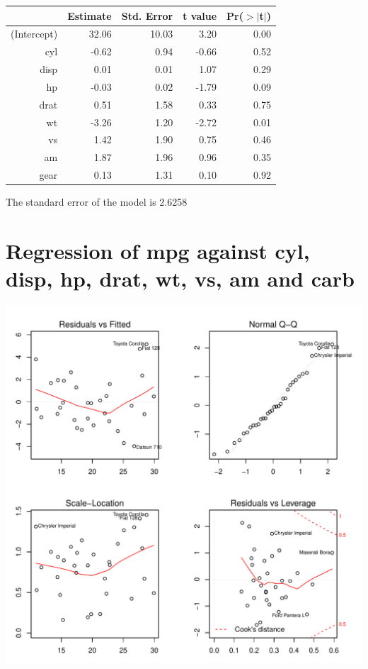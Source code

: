 \documentclass{article}\usepackage[]{graphicx}\usepackage[]{color}
\makeatletter
\def\maxwidth{ %
  \ifdim\Gin@nat@width>\linewidth
    \linewidth
  \else
    \Gin@nat@width
  \fi
}
\newenvironment{knitrout}{}{} %
\makeatother
\begin{document}
\begin{table}[ht]
\centering
\begin{tabular}{rrrrr}
  \hline
 & Estimate & Std. Error & t value & Pr($>$$|$t$|$) \\ 
  \hline
(Intercept) & 32.06 & 10.03 & 3.20 & 0.00 \\ 
  cyl & -0.62 & 0.94 & -0.66 & 0.52 \\ 
  disp & 0.01 & 0.01 & 1.07 & 0.29 \\ 
  hp & -0.03 & 0.02 & -1.79 & 0.09 \\ 
  drat & 0.51 & 1.58 & 0.33 & 0.75 \\ 
  wt & -3.26 & 1.20 & -2.72 & 0.01 \\ 
  vs & 1.42 & 1.90 & 0.75 & 0.46 \\ 
  am & 1.87 & 1.96 & 0.96 & 0.35 \\ 
  gear & 0.13 & 1.31 & 0.10 & 0.92 \\ 
   \hline
\end{tabular}
\end{table}




The standard error of the model is 2.6258

\newpage

\section{Regression of mpg against cyl, disp, hp, drat, wt, vs, am and carb }
\begin{knitrout}
\color{fgcolor}

{\centering \includegraphics[width=\maxwidth]{figure/lm-cyl-disp-hp-drat-wt-vs-am-carb} 

}



\end{knitrout}
\end{document}
